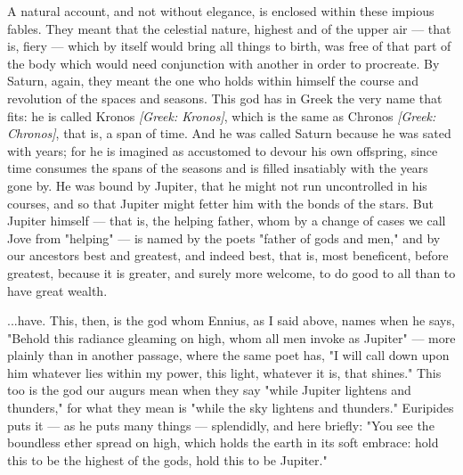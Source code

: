  A natural account, and not without elegance, is enclosed within these impious fables. They meant that the celestial nature, highest and of the upper air — that is, fiery — which by itself would bring all things to birth, was free of that part of the body which would need conjunction with another in order to procreate. By Saturn, again, they meant the one who holds within himself the course and revolution of the spaces and seasons. This god has in Greek the very name that fits: he is called Kronos \textit{[Greek: Kronos]}, which is the same as Chronos \textit{[Greek: Chronos]}, that is, a span of time. And he was called Saturn because he was sated with years; for he is imagined as accustomed to devour his own offspring, since time consumes the spans of the seasons and is filled insatiably with the years gone by. He was bound by Jupiter, that he might not run uncontrolled in his courses, and so that Jupiter might fetter him with the bonds of the stars. But Jupiter himself — that is, the helping father, whom by a change of cases we call Jove from "helping" — is named by the poets "father of gods and men," and by our ancestors best and greatest, and indeed best, that is, most beneficent, before greatest, because it is greater, and surely more welcome, to do good to all than to have great wealth.

 ...have. This, then, is the god whom Ennius, as I said above, names when he says, "Behold this radiance gleaming on high, whom all men invoke as Jupiter" --- more plainly than in another passage, where the same poet has, "I will call down upon him whatever lies within my power, this light, whatever it is, that shines." This too is the god our augurs mean when they say "while Jupiter lightens and thunders," for what they mean is "while the sky lightens and thunders." Euripides puts it --- as he puts many things --- splendidly, and here briefly: "You see the boundless ether spread on high, which holds the earth in its soft embrace: hold this to be the highest of the gods, hold this to be Jupiter."

